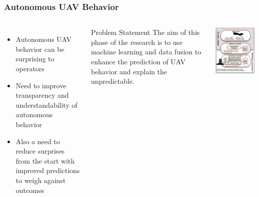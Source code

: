 \documentclass{beamer}
\begin{document}
\begin{frame}
\frametitle{Autonomous UAV Behavior}
\begin{columns}
\begin{itemize}
\item Autonomous UAV behavior can be surprising to operators
\item Need to improve transparency and understandability of autonomous behavior
\item Also a need to reduce surprises from the start with improved predictions to weigh against outcomes
\end{itemize}
\begin{block}{Problem Statement}
{The aim of this phase of the research is to use machine learning and data fusion to enhance the prediction of UAV behavior and explain the unpredictable.}
\end{block}

\includegraphics[width=\textwidth]{epex}
\end{columns}
\end{frame}
\end{document}
